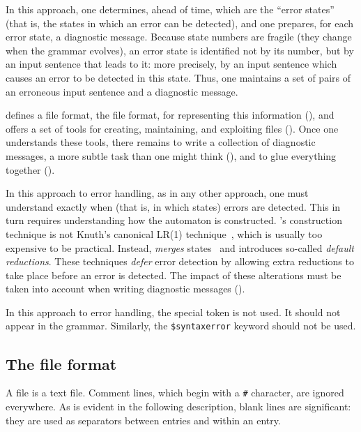 \documentclass[onecolumn,11pt,nocopyrightspace,preprint]{sigplanconf}
\begin{document}
In this approach, one determines, ahead of time, which are the ``error
states'' (that is, the states in which an error can be detected), and one
prepares, for each error state, a diagnostic message. Because state numbers
are fragile (they change when the grammar evolves), an error state is
identified not by its number, but by an input sentence that leads to it: more
precisely, by an input sentence which causes an error to be detected in this
state. Thus, one maintains a set of pairs of an erroneous input sentence and a
diagnostic message.

\menhir defines a file format, the \messages file format,
for representing this information (), and offers a
set of tools for creating, maintaining, and exploiting \messages files
(). Once one understands these tools, there remains
to write a collection of diagnostic messages, a more subtle task than one
might think (), and to glue everything together
().

In this approach to error handling, as in any other approach, one must
understand exactly when (that is, in which states) errors are detected.
This in turn requires understanding how the automaton is constructed.
\menhir's construction technique is not Knuth's canonical LR(1)
technique~\cite{knuth-lr-65}, which is usually too expensive to be practical.
Instead, \menhir \emph{merges} states~\cite{pager-77} and introduces so-called \emph{default
reductions}. These techniques \emph{defer} error detection by allowing
extra reductions to take place before an error is detected.
The impact of these alterations must be taken into account when writing
diagnostic messages ().

In this approach to error handling, the special \error token is not used. It
should not appear in the grammar. Similarly, the \verb+$syntaxerror+ keyword
should not be used.


\subsection{The \messages file format}
\label{sec:messages:format}

A \messages file is a text file. Comment lines, which begin with a \verb+#+
character, are ignored everywhere. As is evident in the following description,
blank lines are significant: they are used as separators between entries and
within an entry.
\end{document}
